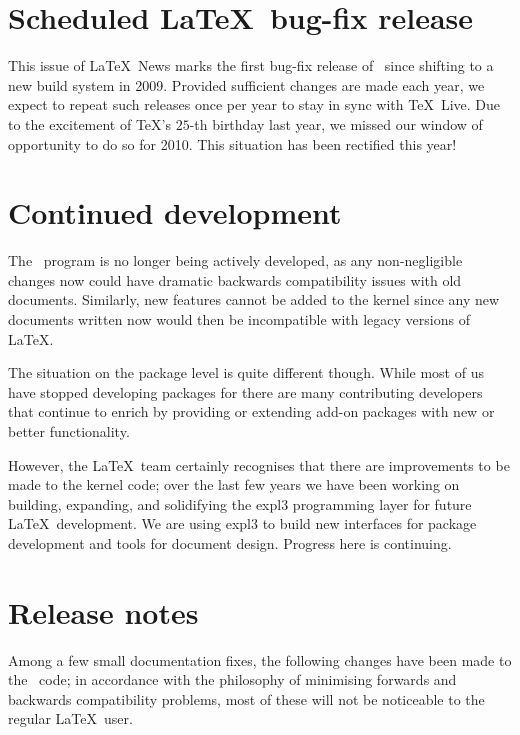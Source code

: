 \documentclass{ltnews}
\begin{document}
\maketitle

\section{Scheduled \LaTeX\ bug-fix release}

This issue of \LaTeX~News marks the first bug-fix release of
\LaTeXe\ since shifting to a new build system in 2009.
Provided sufficient changes are made each year, we expect to
repeat such releases once per year to stay in sync with \TeX\ Live.
Due to the excitement of \TeX's $25$-th birthday last year,
we missed our window of opportunity to do so for 2010.
This situation has been rectified this year!

\section{Continued development}

The \LaTeXe\ program is no longer being actively developed, as any non-negligible changes now could have dramatic backwards compatibility issues with old documents. Similarly, new features cannot be added to the kernel since any new documents written now would then be incompatible with legacy versions of \LaTeX.

The situation on the package level is quite different though. While most of us have stopped developing packages for \LaTeXe{} there are many contributing developers that continue to enrich \LaTeXe{} by providing or extending add-on packages with new or better functionality.

However, the \LaTeX\ team certainly recognises that there are improvements to be made to the kernel code; over the last few years we have been working on building, expanding, and solidifying the \textsf{expl3} programming layer for future \LaTeX\ development. We are using \textsf{expl3} to build new interfaces for package development and tools for document design. Progress here is continuing.

\section{Release notes}

Among a few small documentation fixes, the following changes have been made to the \LaTeXe\ code; in accordance with the philosophy of minimising forwards and backwards compatibility problems, most of these will not be noticeable to the regular \LaTeX\ user.
\end{document}
